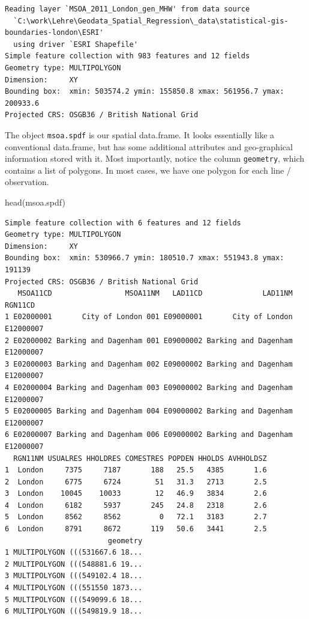 \documentclass[
  letterpaper,
  DIV=11,
  numbers=noendperiod]{scrreprt}
\newenvironment{Shaded}{\begin{snugshade}}{\end{snugshade}}
\newcommand{\FunctionTok}[1]{\textcolor[rgb]{0.28,0.35,0.67}{#1}}
\newcommand{\NormalTok}[1]{\textcolor[rgb]{0.00,0.23,0.31}{#1}}
\begin{document}
\begin{verbatim}
Reading layer `MSOA_2011_London_gen_MHW' from data source 
  `C:\work\Lehre\Geodata_Spatial_Regression\_data\statistical-gis-boundaries-london\ESRI' 
  using driver `ESRI Shapefile'
Simple feature collection with 983 features and 12 fields
Geometry type: MULTIPOLYGON
Dimension:     XY
Bounding box:  xmin: 503574.2 ymin: 155850.8 xmax: 561956.7 ymax: 200933.6
Projected CRS: OSGB36 / British National Grid
\end{verbatim}

The object \texttt{msoa.spdf} is our spatial data.frame. It looks
essentially like a conventional data.frame, but has some additional
attributes and geo-graphical information stored with it. Most
importantly, notice the column \texttt{geometry}, which contains a list
of polygons. In most cases, we have one polygon for each line /
observation.

\begin{Shaded}
\begin{Highlighting}[]
\FunctionTok{head}\NormalTok{(msoa.spdf)}
\end{Highlighting}
\end{Shaded}

\begin{verbatim}
Simple feature collection with 6 features and 12 fields
Geometry type: MULTIPOLYGON
Dimension:     XY
Bounding box:  xmin: 530966.7 ymin: 180510.7 xmax: 551943.8 ymax: 191139
Projected CRS: OSGB36 / British National Grid
   MSOA11CD                 MSOA11NM   LAD11CD              LAD11NM   RGN11CD
1 E02000001       City of London 001 E09000001       City of London E12000007
2 E02000002 Barking and Dagenham 001 E09000002 Barking and Dagenham E12000007
3 E02000003 Barking and Dagenham 002 E09000002 Barking and Dagenham E12000007
4 E02000004 Barking and Dagenham 003 E09000002 Barking and Dagenham E12000007
5 E02000005 Barking and Dagenham 004 E09000002 Barking and Dagenham E12000007
6 E02000007 Barking and Dagenham 006 E09000002 Barking and Dagenham E12000007
  RGN11NM USUALRES HHOLDRES COMESTRES POPDEN HHOLDS AVHHOLDSZ
1  London     7375     7187       188   25.5   4385       1.6
2  London     6775     6724        51   31.3   2713       2.5
3  London    10045    10033        12   46.9   3834       2.6
4  London     6182     5937       245   24.8   2318       2.6
5  London     8562     8562         0   72.1   3183       2.7
6  London     8791     8672       119   50.6   3441       2.5
                        geometry
1 MULTIPOLYGON (((531667.6 18...
2 MULTIPOLYGON (((548881.6 19...
3 MULTIPOLYGON (((549102.4 18...
4 MULTIPOLYGON (((551550 1873...
5 MULTIPOLYGON (((549099.6 18...
6 MULTIPOLYGON (((549819.9 18...
\end{verbatim}
\end{document}
